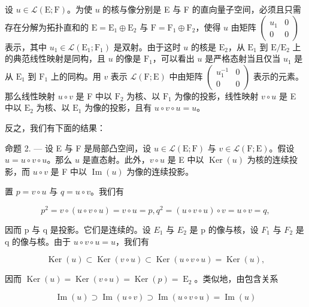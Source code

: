 设 \(u \in \mathcal{L}(\mathrm{E};\mathrm{F})\)。为使 \(u\) 的核与像分别是 E 与 F 的直向量子空间，必须且只需存在分解为拓扑直和的 \(\mathrm{E} = \mathrm{E}_1 \oplus \mathrm{E}_2\) 与 \(\mathrm{F} = \mathrm{F}_1 \oplus \mathrm{F}_2\)，使得 \(u\) 由矩阵 \(\begin{pmatrix} u_1 & 0 \\ 0 & 0 \end{pmatrix}\) 表示，其中 \(u_1 \in \mathcal{L}(\mathrm{E}_1; \mathrm{F}_1)\) 是双射。由于这时 \(u\) 的核是 \(\mathrm{E}_2\)，从 \(\mathrm{E}_1\) 到 \(\mathrm{E}/\mathrm{E}_2\) 上的典范线性映射是同构，且 \(u\) 的像是 \(\mathrm{F}_1\)，可以看出 \(u\) 是严格态射当且仅当 \(u_1\) 是从 \(\mathrm{E}_1\) 到 \(\mathrm{F}_1\) 上的同构。用 \(v\) 表示 \(\mathcal{L}(\mathrm{F};\mathrm{E})\) 中由矩阵 \(\begin{pmatrix} u_1^{-1} & 0 \\ 0 & 0 \end{pmatrix}\) 表示的元素。那么线性映射 \(u \circ v\) 是 F 中以 \(\mathrm{F}_2\) 为核、以 \(\mathrm{F}_1\) 为像的投影，线性映射 \(v \circ u\) 是 E 中以 \(\mathrm{E}_2\) 为核、以 \(\mathrm{E}_1\) 为像的投影，且有 \(u \circ v \circ u = u\)。

反之，我们有下面的结果：

命题 2. --- 设 E 与 F 是局部凸空间，设 \(u \in \mathcal{L}(\mathrm{E};\mathrm{F})\) 与 \(v \in \mathcal{L}(\mathrm{F};\mathrm{E})\)。假设 \(u = u \circ v \circ u\)。那么 \(u\) 是直态射。此外，\(v \circ u\) 是 E 中以 \(\operatorname{Ker}(u)\) 为核的连续投影，而 \(u \circ v\) 是 F 中以 \(\operatorname{Im}(u)\) 为像的连续投影。

置 \(p = v \circ u\) 与 \(q = u \circ v\)。我们有

\[
p ^ {2} = v \circ (u \circ v \circ u) = v \circ u = p, q ^ {2} = (u \circ v \circ u) \circ v = u \circ v = q,
\]

因而 p 与 q 是投影。它们是连续的。设 \(E_{1}\) 与 \(E_{2}\) 是 p 的像与核，设 \(F_{1}\) 与 \(F_{2}\) 是 q 的像与核。由于 \(u \circ v \circ u = u\)，我们有

\[
\operatorname{Ker} (u) \subset \operatorname{Ker} (v \circ u) \subset \operatorname{Ker} (u \circ v \circ u) = \operatorname{Ker} (u),
\]

因而 \(\operatorname{Ker}(u) = \operatorname{Ker}(v \circ u) = \operatorname{Ker}(p) = \operatorname{E}_{2}\)。类似地，由包含关系

\[
\operatorname{Im} (u) \supset \operatorname{Im} (u \circ v) \supset \operatorname{Im} (u \circ v \circ u) = \operatorname{Im} (u)
\]

